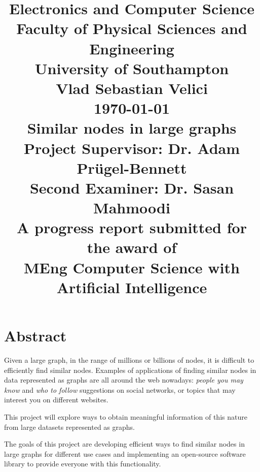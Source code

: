 \documentclass[12pt]{report}
\begin{document}
\title{ \normalsize Electronics and Computer Science\\
Faculty of Physical Sciences and Engineering\\
University of Southampton
        \\ [2.0cm]
        Vlad Sebastian Velici \\
        \today
        \\ [1.0cm]
        {\LARGE \textbf{Similar nodes in large graphs}}
        \\ [1.0cm]
        Project Supervisor: Dr. Adam Prügel-Bennett \\
Second Examiner: Dr. Sasan Mahmoodi
	\\ [2.0cm]
	A progress report submitted for the award of \\
MEng Computer Science with Artificial Intelligence
        \normalsize \vspace*{5\baselineskip}}

\date{}

\maketitle
\tableofcontents
\newpage

\section*{Abstract}
Given a large graph, in the range of millions or billions of nodes, it is difficult
to efficiently find similar nodes. Examples of applications of finding similar
nodes in data represented as graphs are all around the web nowadays:
\textit{people you may know} and \textit{who to follow} suggestions on social
networks, or topics that may interest you on different websites.


This project will explore ways to obtain meaningful information of this nature
from large datasets represented as graphs.


The goals of this project are developing efficient ways to find similar nodes in
large graphs for different use cases and implementing an open-source software
library to provide everyone with this functionality.
\newpage
\end{document}
